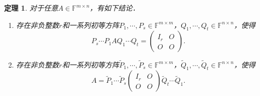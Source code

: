 \documentclass[a4paper,fontset=windows]{ctexbook}
\newtheorem{theorem}{定理}[chapter]
\theoremstyle{definition}
\begin{document}
\begin{theorem}\label{thm2.5}
对于任意$A\in\mathbb{F}^{m\times n}$，有如下结论．
\begin{enumerate}
\item 存在非负整数$r$和一系列初等方阵$P_1,\cdots,P_s\in\mathbb{F}^{m\times m}$，$Q_1,\cdots,Q_t\in\mathbb{F}^{n\times n}$，使得
$$P_s\cdots P_1AQ_1\cdots Q_t=\begin{pmatrix}I_r&O \\ O&O\end{pmatrix}.$$

\item 存在非负整数$r$和一系列初等方阵$\widetilde{P}_1,\cdots,\widetilde{P}_s\in\mathbb{F}^{m\times m}$，$\widetilde{Q}_1,\cdots,\widetilde{Q}_t\in\mathbb{F}^{n\times n}$，使得
$$A=\widetilde{P}_1\cdots\widetilde{P}_s\begin{pmatrix}I_r&O \\ O&O\end{pmatrix}\widetilde{Q}_t\cdots\widetilde{Q}_1.$$
\end{enumerate}
\end{theorem}
\end{document}
